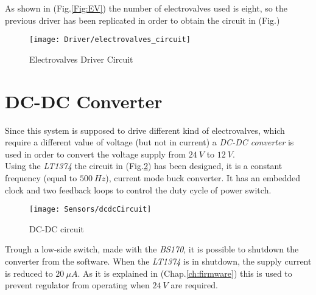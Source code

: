 As shown in (Fig.\ref{Fig:EV}) the number of electrovalves used is eight, so the previous driver has been replicated in order to obtain the circuit in (Fig.)

\begin{figure}[h]
	\centering
	\texttt{[image: Driver/electrovalves\_circuit]}
	\caption{Electrovalves Driver Circuit}
	\label{Fig:electrovalves_circuit}
\end{figure}

\section{DC-DC Converter}

Since this system is supposed to drive different kind of electrovalves, which require a different value of voltage (but not in current) a \textit{DC-DC converter} is used in order to convert the voltage supply from $24\ V$ to $12\ V$. \\

Using the \textit{LT1374} the circuit in (Fig.\ref{Fig:DCDC}) has been designed, it is a constant frequency (equal to $500\ Hz$), current mode buck converter. It has an embedded clock and two feedback loops to control the duty cycle of power switch.\\

\begin{figure}[h]
	\begin{center}
		\texttt{[image: Sensors/dcdcCircuit]}
		\caption{DC-DC circuit}
		\label{Fig:DCDC}
	\end{center}
\end{figure}


Trough a low-side switch, made with the \textit{BS170}, it is possible to shutdown the converter from the software. When the \textit{LT1374} is in shutdown, the supply current is reduced to $20\ \mu A$. As it is explained in (Chap.\ref{ch:firmware}) this is used to prevent regulator from operating when $24\ V$ are required.\\

